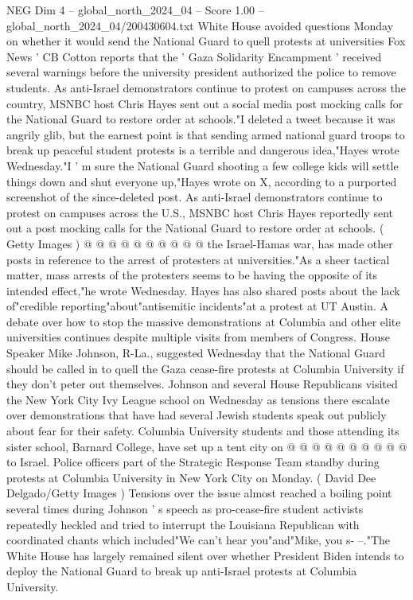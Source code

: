 \begin{textsample}{NEG Dim 4 – global\_north\_2024\_04 – Score 1.00 – global\_north\_2024\_04/200430604.txt}  \label{ex:f4_neg_100}
White House avoided questions Monday on whether it would send the National Guard to quell protests at universities Fox News ' CB Cotton reports that the ' Gaza Solidarity Encampment ' received several warnings before the university president authorized the police to remove students.
As anti-Israel demonstrators continue to protest on campuses across the country, MSNBC host Chris Hayes sent out a social media post mocking calls for the National Guard to restore order at schools."I deleted a tweet because it was angrily glib, but the earnest point is that sending armed national guard troops to break up peaceful student protests is a terrible and dangerous idea,"Hayes wrote Wednesday."I ' m sure the National Guard shooting a few college kids will settle things down and shut everyone up,"Hayes wrote on X, according to a purported screenshot of the since-deleted post.
As anti-Israel demonstrators continue to protest on campuses across the U.S., MSNBC host Chris Hayes reportedly sent out a post mocking calls for the National Guard to restore order at schools. ( Getty Images ) @ @ @ @ @ @ @ @ @ @ the Israel-Hamas war, has made other posts in reference to the arrest of protesters at universities."As a sheer tactical matter, mass arrests of the protesters seems to be having the opposite of its intended effect,"he wrote Wednesday.
Hayes has also shared posts about the lack of"credible reporting"about"antisemitic incidents"at a protest at UT Austin.
A debate over how to stop the massive demonstrations at Columbia and other elite universities continues despite multiple visits from members of Congress.
House Speaker Mike Johnson, R-La., suggested Wednesday that the National Guard should be called in to quell the Gaza cease-fire protests at Columbia University if they don't peter out themselves.
Johnson and several House Republicans visited the New York City Ivy League school on Wednesday as tensions there escalate over demonstrations that have had several Jewish students speak out publicly about fear for their safety.
Columbia University students and those attending its sister school, Barnard College, have set up a tent city on @ @ @ @ @ @ @ @ @ @ to Israel.
Police officers part of the Strategic Response Team standby during protests at Columbia University in New York City on Monday. ( David Dee Delgado/Getty Images ) Tensions over the issue almost reached a boiling point several times during Johnson ' s speech as pro-cease-fire student activists repeatedly heckled and tried to interrupt the Louisiana Republican with coordinated chants which included"We can't hear you"and"Mike, you s- --."The White House has largely remained silent over whether President Biden intends to deploy the National Guard to break up anti-Israel protests at Columbia University.

\end{textsample}
